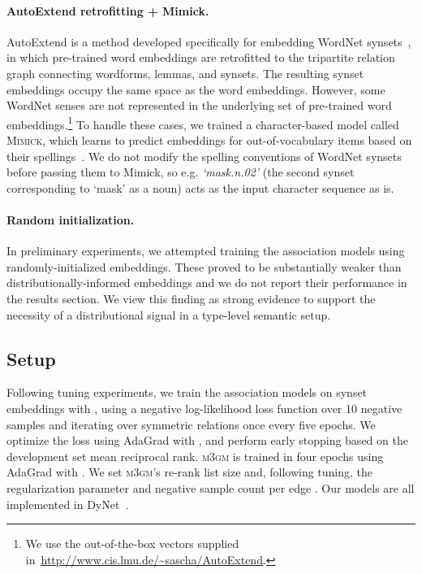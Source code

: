 \documentclass[11pt,twocolumn]{article}
\newcommand{\WN}[0]{WordNet}
\newcommand{\sysname}[0]{\textsc{m3gm}}
\begin{document}
\paragraph{AutoExtend retrofitting + Mimick.}
AutoExtend is a method developed specifically for embedding \WN{} synsets~\cite{Rothe2015AutoExtend}, in which pre-trained word embeddings are retrofitted to the tripartite relation graph connecting wordforms, lemmas, and synsets.
The resulting synset embeddings occupy the same space as the word embeddings.
However, some \WN{} senses are not represented in the underlying set of pre-trained word embeddings.\footnote{We use the out-of-the-box vectors supplied in~\url{http://www.cis.lmu.de/~sascha/AutoExtend}.}
To handle these cases, we trained a character-based model called \textsc{Mimick}, which learns to predict embeddings for out-of-vocabulary items based on their spellings~\cite{pinter2017mimicking}.
We do not modify the spelling conventions of \WN{} synsets before passing them to Mimick, so e.g. \textit{`mask.n.02'} (the second synset corresponding to `mask' as a noun) acts as the input character sequence as is.

\paragraph{Random initialization.} In preliminary experiments, we attempted training the association models using randomly-initialized embeddings.
These proved to be substantially weaker than distributionally-informed embeddings and we do not report their performance in the results section.
We view this finding as strong evidence to support the necessity of a distributional signal in a type-level semantic setup.

\subsection{Setup}

Following tuning experiments, we train the association models on synset embeddings with , using a negative log-likelihood loss function over 10 negative samples and iterating over symmetric relations once every five epochs.
We optimize the loss using AdaGrad with , and perform early stopping based on the development set mean reciprocal rank.
\sysname{} is trained in four epochs using AdaGrad with .
We set \sysname's re-rank list size  and, following tuning, the regularization parameter  and negative sample count per edge . Our models are all implemented in DyNet~\cite{dynet}.
\end{document}
